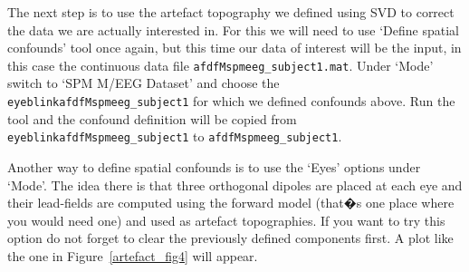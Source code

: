 The next step is to use the artefact topography we defined using SVD to correct the data we are actually interested in. For this we will need to use `Define spatial confounds' tool once again, but this time our data of interest will be the input, in this case the continuous data file \texttt{afdfMspmeeg\_subject1.mat}. Under `Mode' switch to `SPM M/EEG Dataset' and choose the \texttt{eyeblinkafdfMspmeeg\_subject1} for which we defined confounds above. Run the tool and the confound definition will be copied from \texttt{eyeblinkafdfMspmeeg\_subject1} to \texttt{afdfMspmeeg\_subject1}.

Another way to define spatial confounds is to use the `Eyes' options under `Mode'. The idea there is that three orthogonal dipoles are placed at each eye and their lead-fields are computed using the forward model (that�s one place where you would need one) and used as artefact topographies. If you want to try this option do not forget to clear the previously defined components first. A plot like the one in Figure~\ref{artefact_fig4} will appear.

